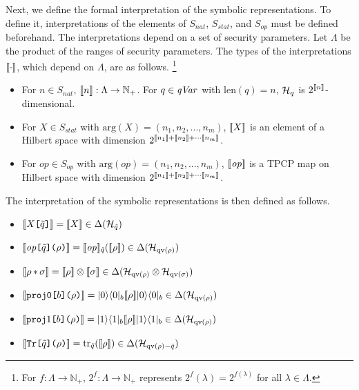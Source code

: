 Next, we define the formal interpretation of the symbolic
representations.
To define it, interpretations of the elements of 
$S_{\mathit{nat}}$, $S_{\mathit{stat}}$, and $S_{\mathit{op}}$ must be
defined beforehand. The interpretations depend on a set of
security parameters. Let $\Lambda$ be the product of
the ranges of security parameters.
The types of the interpretations $[\![\cdot]\!]$, which 
depend on $\Lambda$, are as
follows. \footnote{For $f : \Lambda \rightarrow \mathbb{N}_+$, 
$2^{f} : \Lambda \rightarrow \mathbb{N}_+$ represents
$2^{f}(\lambda) = 2^{f(\lambda)}$ for all $\lambda \in \Lambda$.}
\begin{itemize}
 \item For $n \in S_{\mathit{nat}}$, $[\![n]\!] :
       \Lambda \rightarrow \mathbb{N}_+$. For $q \in \mathit{qVar}$ with 
       $\mathrm{len}(q) = n$, $\mathcal{H}_q$ is $2^{[\![n]\!]}$-dimensional.
 \item For $X \in S_{\mathit{stat}}$ with
       $\mathrm{arg}(X) = (n_1,n_2,...,n_m)$, $[\![X]\!]$
       is an element of a Hilbert space with dimension
       $2^{[\![n_1]\!]+
       [\![n_2]\!] + \cdots[\![n_m]\!]}$.
 \item For $\mathit{op} \in S_{\mathit{op}}$ with
       $\mathrm{arg}(\mathit{op}) = (n_1,n_2,...,n_m)$,
       $[\![\mathit{op}]\!]$
       is a TPCP map on Hilbert space with dimension
       $2^{[\![n_1]\!] +
       [\![n_2]\!] + \cdots[\![n_m]\!]}$.
\end{itemize}
The interpretation of the symbolic representations is then 
defined as follows.
\begin{itemize}
 \item $[\![X\texttt{[}\tilde q\texttt{]}]\!] =
       [\![X]\!] \in \Delta(\mathcal{H}_{\tilde q})$
 \item $[\![\mathit{op}\texttt{[}\tilde
       q\texttt{](}\rho\texttt{)}]\!] =
       [\![\mathit{op}]\!]_{\tilde q}([\![\rho]\!])
       \in \Delta(\mathcal{H}_{\mathrm{qv}(\rho)})$
 \item $[\![\rho \,\mathtt{*} \, \sigma]\!] = 
       [\![\rho]\!] \otimes
       [\![\sigma]\!] \in \Delta(\mathcal{H}_{\mathrm{qv}(\rho)} \otimes
       \mathcal{H}_{\mathrm{qv}(\sigma)})$
 \item $[\![\mathtt{proj0}\texttt{[}b\texttt{](}\rho\texttt{)}]\!]
       =
       |0\rangle\langle 0|_b [\![\rho]\!] |0\rangle\langle 0|_b \in
       \Delta(\mathcal{H}_{\mathrm{qv}(\rho)})$
 \item $[\![\mathtt{proj}1\texttt{[}b\texttt{](}\rho\texttt{)}]\!] 
       =
       |1\rangle\langle 1|_b[\![\rho]\!]|1\rangle\langle 1|_b \in
       \Delta(\mathcal{H}_{\mathrm{qv}(\rho)})$
 \item $[\![\mathtt{Tr}\texttt{[}\tilde q\texttt{](}\rho\texttt{)}]\!]
       =
       {\rm tr}_{\tilde q}([\![\rho]\!]) \in
       \Delta(\mathcal{H}_{\mathrm{qv}(\rho) - \tilde q})$
\end{itemize}
